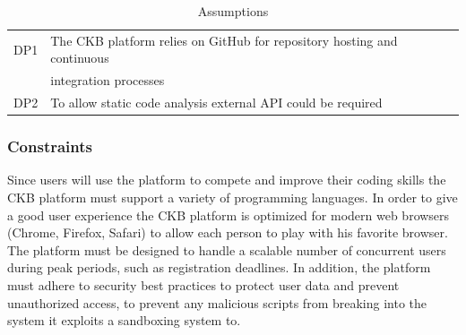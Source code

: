 \begin{table}[h]
    \centering
    \begin{tabular}{|l|l|}
    \hline
        DP1 & The CKB platform relies on GitHub for repository hosting and continuous\\
        &integration processes\\
    \hline
        DP2 & To allow static code analysis external API could be required\\
    \hline
    \end{tabular}
    \caption{Assumptions}
    \label{tab:assumptions}
\end{table}


\subsubsection{Constraints}
Since users will use the platform to compete and improve their coding skills the CKB platform must support a variety of programming languages.
In order to give a good user experience the CKB platform is optimized for modern web browsers (Chrome, Firefox, Safari) to allow each person to play with his favorite browser.
The platform must be designed to handle a scalable number of concurrent users during peak periods, such as registration deadlines. In addition, the platform must adhere to security best practices to protect user data and prevent unauthorized access, to prevent any malicious scripts from breaking into the system it exploits a sandboxing system to.